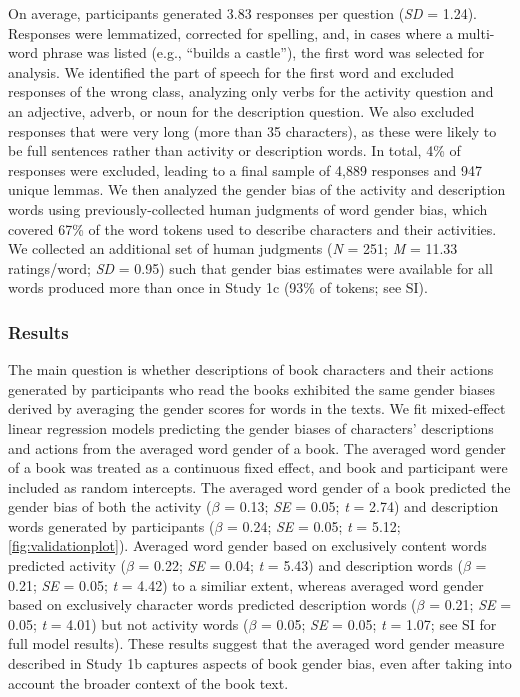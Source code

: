 \documentclass[
  english,
  ,man,floatsintext]{apa6}
\begin{document}
On average, participants generated 3.83 responses per question (\emph{SD} = 1.24). Responses were lemmatized, corrected for spelling, and, in cases where a multi-word phrase was listed (e.g., \enquote{builds a castle}), the first word was selected for analysis. We identified the part of speech for the first word and excluded responses of the wrong class, analyzing only verbs for the activity question and an adjective, adverb, or noun for the description question. We also excluded responses that were very long (more than 35 characters), as these were likely to be full sentences rather than activity or description words. In total, 4\% of responses were excluded, leading to a final sample of 4,889 responses and 947 unique lemmas. We then analyzed the gender bias of the activity and description words using previously-collected human judgments of word gender bias, which covered 67\% of the word tokens used to describe characters and their activities. We collected an additional set of human judgments (\emph{N} = 251; \emph{M} = 11.33 ratings/word; \emph{SD} = 0.95) such that gender bias estimates were available for all words produced more than once in Study 1c (93\% of tokens; see SI).

\hypertarget{results-1}{%
\subsubsection{Results}\label{results-1}}

The main question is whether descriptions of book characters and their actions generated by participants who read the books exhibited the same gender biases derived by averaging the gender scores for words in the texts. We fit mixed-effect linear regression models predicting the gender biases of characters' descriptions and actions from the averaged word gender of a book. The averaged word gender of a book was treated as a continuous fixed effect, and book and participant were included as random intercepts. The averaged word gender of a book predicted the gender bias of both the activity (\(\beta\) = 0.13; \emph{SE} = 0.05; \emph{t} = 2.74) and description words generated by participants (\(\beta\) = 0.24; \emph{SE} = 0.05; \emph{t} = 5.12; \autoref{fig:validationplot}). Averaged word gender based on exclusively content words predicted activity (\(\beta\) = 0.22; \emph{SE} = 0.04; \emph{t} = 5.43) and description words (\(\beta\) = 0.21; \emph{SE} = 0.05; \emph{t} = 4.42) to a similiar extent, whereas averaged word gender based on exclusively character words predicted description words (\(\beta\) = 0.21; \emph{SE} = 0.05; \emph{t} = 4.01) but not activity words (\(\beta\) = 0.05; \emph{SE} = 0.05; \emph{t} = 1.07; see SI for full model results). These results suggest that the averaged word gender measure described in Study 1b captures aspects of book gender bias, even after taking into account the broader context of the book text.
\end{document}

